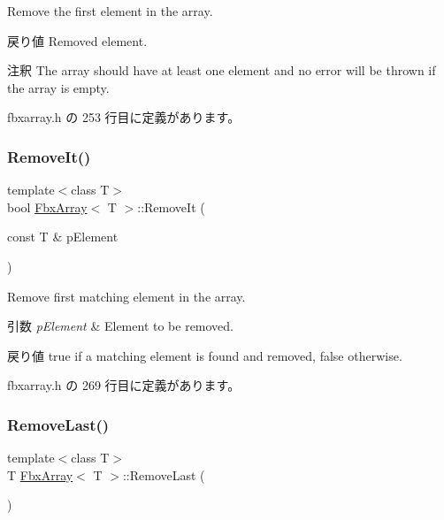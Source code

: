Remove the first element in the array. \begin{DoxyReturn}{戻り値}
Removed element. 
\end{DoxyReturn}
\begin{DoxyRemark}{注釈}
The array should have at least one element and no error will be thrown if the array is empty. 
\end{DoxyRemark}


 fbxarray.\+h の 253 行目に定義があります。

\mbox{\label{class_fbx_array_aed7ae152655404e95e5107824721e93c}} 
\subsubsection{\texorpdfstring{Remove\+It()}{RemoveIt()}}
{\footnotesize\ttfamily template$<$class T$>$ \\
bool \hyperlink{class_fbx_array}{Fbx\+Array}$<$ T $>$\+::Remove\+It (\begin{DoxyParamCaption}\item[{const T \&}]{p\+Element }\end{DoxyParamCaption})\hspace{0.3cm}{\ttfamily [inline]}}

Remove first matching element in the array. 
\begin{DoxyParams}{引数}
{\em p\+Element} & Element to be removed. \\
\hline
\end{DoxyParams}
\begin{DoxyReturn}{戻り値}
{\ttfamily true} if a matching element is found and removed, {\ttfamily false} otherwise. 
\end{DoxyReturn}


 fbxarray.\+h の 269 行目に定義があります。

\mbox{\label{class_fbx_array_ac346e868cc4a37ea1c292bdd9c3eca2e}} 
\subsubsection{\texorpdfstring{Remove\+Last()}{RemoveLast()}}
{\footnotesize\ttfamily template$<$class T$>$ \\
T \hyperlink{class_fbx_array}{Fbx\+Array}$<$ T $>$\+::Remove\+Last (\begin{DoxyParamCaption}{ }\end{DoxyParamCaption})\hspace{0.3cm}{\ttfamily [inline]}}

